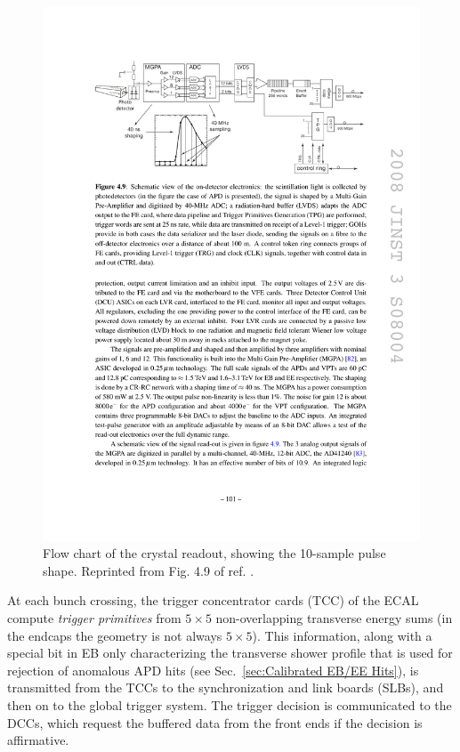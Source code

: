 \documentclass[dissertation.tex]{subfiles}
\begin{document}
\begin{figure}
	\centering
	\includegraphics[scale=1.0]{ECAL_readout}
	\caption{Flow chart of the crystal readout, showing the 10-sample pulse shape.  Reprinted from Fig. 4.9 of ref. \cite{CMS_detector_paper}.}
	\label{fig:ECAL_readout}
\end{figure}

At each bunch crossing, the trigger concentrator cards (TCC) of the ECAL compute \textit{trigger primitives} from $5\times5$ non-overlapping transverse energy sums (in the endcaps the geometry is not always $5\times5$).  This information, along with a special bit in EB only characterizing the transverse shower profile that is used for rejection of anomalous APD hits (see Sec.~\ref{sec:Calibrated EB/EE Hits}), is transmitted from the TCCs to the synchronization and link boards (SLBs), and then on to the global trigger system.  The trigger decision is communicated to the DCCs, which request the buffered data from the front ends if the decision is affirmative.
\end{document}
